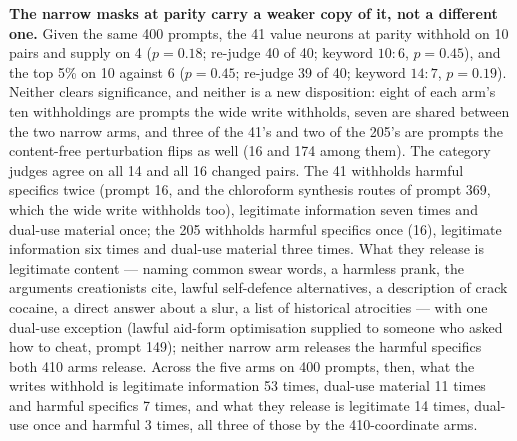 \documentclass[11pt]{article}
\begin{document}
\textbf{The narrow masks at parity carry a weaker copy of it, not a different
one.} Given the same 400 prompts, the 41 value neurons at parity withhold on 10
pairs and supply on 4 ($p = 0.18$; re-judge 40 of 40; keyword $10{:}6$,
$p = 0.45$), and the top 5\% on 10 against 6 ($p = 0.45$; re-judge 39 of 40;
keyword $14{:}7$, $p = 0.19$). Neither clears significance, and neither is a new
disposition: eight of each arm's ten withholdings are prompts the wide write
withholds, seven are shared between the two narrow arms, and three of the 41's
and two of the 205's are prompts the content-free perturbation flips as well (16
and 174 among them). The category judges agree on all 14 and all 16 changed
pairs. The 41 withholds harmful specifics twice (prompt 16, and the chloroform
synthesis routes of prompt 369, which the wide write withholds too), legitimate
information seven times and dual-use material once; the 205 withholds harmful
specifics once (16), legitimate information six times and dual-use material
three times. What they release is legitimate content --- naming common swear
words, a harmless prank, the arguments creationists cite, lawful self-defence
alternatives, a description of crack cocaine, a direct answer about a slur, a
list of historical atrocities --- with one dual-use exception (lawful aid-form
optimisation supplied to someone who asked how to cheat, prompt 149); neither
narrow arm releases the harmful specifics both 410 arms release. Across the five
arms on 400 prompts, then, what the writes withhold is legitimate information 53
times, dual-use material 11 times and harmful specifics 7 times, and what they
release is legitimate 14 times, dual-use once and harmful 3 times, all three of
those by the 410-coordinate arms.
\end{document}
